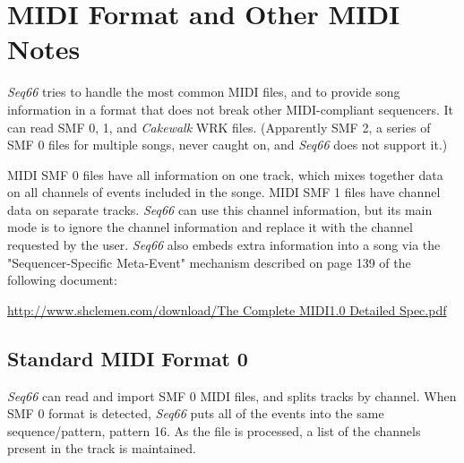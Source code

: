%
%
%

\section{MIDI Format and Other MIDI Notes}
\label{sec:midi_format_and_midi_notes}

   \textsl{Seq66} tries to handle the most common MIDI files, and to provide
   song information in a format that does not break other MIDI-compliant
   sequencers.  It can read SMF 0, 1, and \textsl{Cakewalk} WRK files.
   (Apparently SMF 2, a series of SMF 0 files for multiple songs,
   never caught on, and \textsl{Seq66} does not support it.)

   MIDI SMF 0 files have all information on one track, which mixes together
   data on all channels of events included in the songe.
   MIDI SMF 1 files have channel data on separate tracks.
   \textsl{Seq66} can use this channel information, but its main mode is to
   ignore the channel information and replace it with the channel requested by
   the user.
   \textsl{Seq66} also embeds extra information into a song via the
   "Sequencer-Specific Meta-Event" mechanism described on page 139 of the
   following document:

   \url{http://www.shclemen.com/download/The Complete MIDI1.0 Detailed Spec.pdf}

%

\subsection{Standard MIDI Format 0}
\label{subsec:midi_format_smf_0}

   \textsl{Seq66} can read and import SMF 0 MIDI files, and splits tracks by
   channel.
   When SMF 0 format is detected, \textsl{Seq66} puts all of
   the events into the same sequence/pattern, pattern 16.
   As the file is processed, a list of the channels present in the
   track is maintained.

